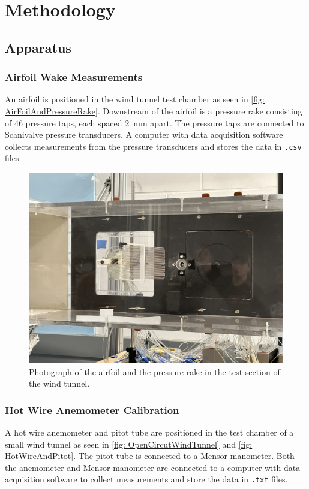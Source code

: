 \chapter{Methodology}
\label{cp:methodology}

\section{Apparatus}\label{sec:apparatus}
\subsection{Airfoil Wake Measurements}
An airfoil is positioned in the wind tunnel test chamber as seen in \autoref{fig: AirFoilAndPressureRake}. Downstream of the airfoil is a pressure rake consisting of \num{46} pressure taps, each spaced \qty{2}{\milli\meter} apart. The pressure taps are connected to Scanivalve pressure transducers. A computer with data acquisition software collects measurements from the pressure transducers and stores the data in \verb|.csv| files.

\begin{figure}[htpb]
    \centering
    \includegraphics[width=0.75\linewidth]{Figures/IMG_3196.jpeg}
    \caption[Image of Airfoil and The Pressure Rake in Test Section.]{Photograph of the airfoil and the pressure rake in the test section of the wind tunnel.}
    \label{fig: AirFoilAndPressureRake}
\end{figure}

\subsection{Hot Wire Anemometer Calibration}
A hot wire anemometer and pitot tube are positioned in the test chamber of a small wind tunnel as seen in \autoref{fig: OpenCircutWindTunnel} and \autoref{fig: HotWireAndPitot}. The pitot tube is connected to a Mensor manometer. Both the anemometer and Mensor manometer are connected to a computer with data acquisition software to collect measurements and store the data in \verb|.txt| files. 

